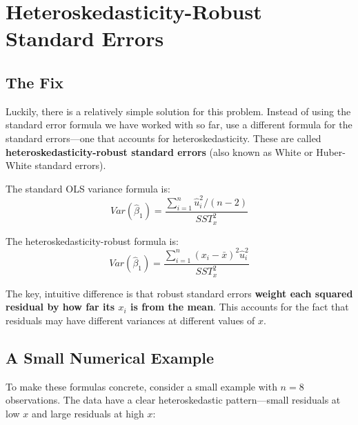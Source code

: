 \documentclass[
  letterpaper,
  DIV=11,
  numbers=noendperiod]{scrreprt}
\begin{document}
\section{Heteroskedasticity-Robust Standard
Errors}\label{heteroskedasticity-robust-standard-errors}

\subsection{The Fix}\label{the-fix}

Luckily, there is a relatively simple solution for this problem. Instead
of using the standard error formula we have worked with so far, use a
different formula for the standard errors---one that accounts for
heteroskedasticity. These are called \textbf{heteroskedasticity-robust
standard errors} (also known as White or Huber-White standard errors).

The standard OLS variance formula is:
\[Var(\hat{\beta}_1) = \frac{\sum_{i=1}^{n}\hat{u}_i^2 / (n-2)}{SST_x^2}\]

The heteroskedasticity-robust formula is:
\[Var(\hat{\beta}_1) = \frac{\sum_{i=1}^{n}(x_i - \bar{x})^2\hat{u}_i^2}{SST_x^2}\]

The key, intuitive difference is that robust standard errors
\textbf{weight each squared residual by how far its \(x_i\) is from the
mean}. This accounts for the fact that residuals may have different
variances at different values of \(x\).

\subsection{A Small Numerical Example}\label{a-small-numerical-example}

To make these formulas concrete, consider a small example with \(n = 8\)
observations. The data have a clear heteroskedastic pattern---small
residuals at low \(x\) and large residuals at high \(x\):
\end{document}
